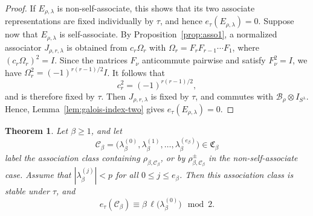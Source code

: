 \documentclass[reqno]{amsart}
\newtheorem{theorem}{Theorem}[section] %
\theoremstyle{definition}
\begin{document}
\begin{proof}
If $E_{\rho,\lambda}$ is non-self-associate, this shows that its two
associate representations are fixed individually by $\tau$, and hence $
e_\tau(E_{\rho,\lambda})=0 $.
Suppose now that $E_{\rho,\lambda}$ is self-associate. By
Proposition~\ref{prop:asso1}, a normalized associator $J_{\rho,r,\lambda}$
is obtained from $ c_r\Omega_r$ with $\Omega_r=F_rF_{r-1}\cdots F_1$,
where $ (c_r\Omega_r)^2=I$. Since the matrices $F_\nu$ anticommute
pairwise and satisfy $F_\nu^2=I$, we have $ \Omega_r^2 =
(-1)^{r(r-1)/2}I$.
It follows that
\[
c_r^2=(-1)^{r(r-1)/2},
\]
and is therefore fixed by $\tau$. Then
$J_{\rho,r,\lambda}$ is fixed by $\tau$, and commutes with $\mathcal
B_\rho\otimes I_{S^\lambda}$. Hence, Lemma~\ref{lem:galois-index-two}
gives $e_\tau(E_{\rho,\lambda})=0$.
\end{proof}

\begin{theorem}
\label{thm:galois-level-beta}
Let $\beta\geq 1$, and let
\[
\mathcal C_\beta
=
\bigl(
\lambda_\beta^{(0)},\lambda_\beta^{(1)},\ldots,
\lambda_\beta^{(e_\beta)} 
\bigr) \in \mathfrak C_\beta
\]
label the association class containing $\rho_{\beta,\mathcal
C_\beta}$, or by $\rho_{\beta,\mathcal C_\beta}^\pm$ in the
non-self-associate case. Assume that $|\lambda_\beta^{(j)}|< p$ for all
$0\leq j\leq e_\beta$. Then this association class is stable under $\tau$,
and
\[
e_\tau(\mathcal C_\beta) \equiv \beta\,\ell\bigl(\lambda_\beta^{(0)}\bigr)
\mod2.
\]
\end{theorem}
\end{document}
